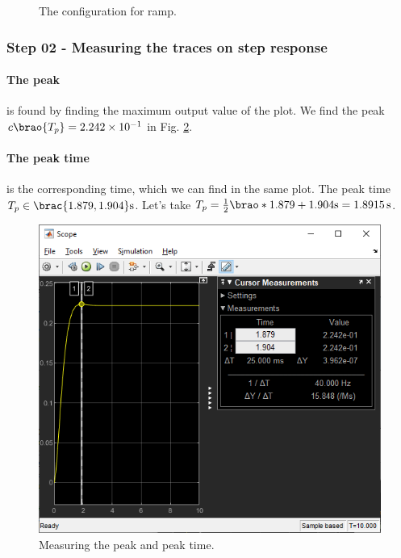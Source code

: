 \documentclass[12pt]{article}
\DeclarePairedDelimiter\brao()%
\DeclarePairedDelimiter\brac[]%
\begin{document}
\begin{figure}[h]
    \centering
    \caption{The configuration for ramp.}
    \label{fig:ramp response model parameters}
\end{figure}

\subsubsection{Step 02 - Measuring the traces on step response}

\paragraph{The peak} is found by finding the maximum output value of the plot.
We find the peak $c\brao{T_p} = \num{2.242e-1}$ in Fig. \ref{fig:step - measuring peak}.

\paragraph{The peak time} is the corresponding time, which we can find in the same plot.
The peak time $T_p \in \brac{{1.879}, {1.904}}\si\second$.
Let's take $T_p = \frac12\brao*{1.879 + 1.904}\si\second = \SI{1.8915}\second$.

\begin{figure}[h]
    \centering
    \includegraphics[width=\linewidth]{part01a_measuring_peak.png}
    \caption{Measuring the peak and peak time.}
    \label{fig:step - measuring peak}
\end{figure}
\end{document}
